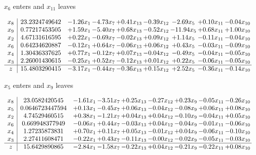 \documentclass[9pt]{article}
\begin{document}
 $ x_{6} $ enters and $ x_{11} $ leaves 

 \[\begin{array}{c| c c@{\hskip 2pt} c@{\hskip 2pt} c@{\hskip 2pt} c@{\hskip 2pt} c@{\hskip 2pt} c@{\hskip 2pt} c@{\hskip 2pt} }
 x_{8}   &  23.2324749642 & -1.26 x_{1} & -4.73 x_{7} & +  0.41 x_{13} & -0.39 x_{12} & -2.69 x_{5} & +  0.10 x_{11} & -0.04 x_{10}\\
 x_{9}   &  0.77217453505 & +  1.59 x_{1} & -5.40 x_{7} & +  0.68 x_{13} & -0.52 x_{12} & -11.94 x_{5} & +  0.68 x_{11} & +  1.00 x_{10}\\
 x_{2}   &  4.67131616595 & +  0.22 x_{1} & -0.69 x_{7} & -0.02 x_{13} & +  0.09 x_{12} & +  1.14 x_{5} & -0.11 x_{11} & -0.04 x_{10}\\
 x_{6}   &  0.64234620887 & -0.12 x_{1} & +  0.64 x_{7} & -0.06 x_{13} & +  0.06 x_{12} & +  0.43 x_{5} & -0.03 x_{11} & -0.09 x_{10}\\
 x_{4}   &  1.30436337625 & +  0.77 x_{1} & -0.12 x_{7} & +  0.07 x_{13} & -0.04 x_{12} & -0.49 x_{5} & -0.04 x_{11} & -0.05 x_{10}\\
 x_{3}   &  2.26001430615 & -0.25 x_{1} & +  0.52 x_{7} & -0.12 x_{13} & +  0.01 x_{12} & +  0.22 x_{5} & -0.06 x_{11} & -0.05 x_{10}\\
\hline
z    &  15.4803290415 & -3.17 x_{1} & -0.44 x_{7} & -0.36 x_{13} & +  0.15 x_{12} & +  2.52 x_{5} & -0.36 x_{11} & -0.14 x_{10}\\
\end{array}\]


 $ x_{5} $ enters and $ x_{9} $ leaves 

 \[\begin{array}{c| c c@{\hskip 2pt} c@{\hskip 2pt} c@{\hskip 2pt} c@{\hskip 2pt} c@{\hskip 2pt} c@{\hskip 2pt} c@{\hskip 2pt} }
 x_{8}   &  23.0582420545 & -1.61 x_{1} & -3.51 x_{7} & +  0.25 x_{13} & -0.27 x_{12} & +  0.23 x_{9} & -0.05 x_{11} & -0.26 x_{10}\\
 x_{5}   &  0.0646723447594 & +  0.13 x_{1} & -0.45 x_{7} & +  0.06 x_{13} & -0.04 x_{12} & -0.08 x_{9} & +  0.06 x_{11} & +  0.08 x_{10}\\
 x_{2}   &  4.74529460515 & +  0.38 x_{1} & -1.21 x_{7} & +  0.04 x_{13} & +  0.04 x_{12} & -0.10 x_{9} & -0.04 x_{11} & +  0.05 x_{10}\\
 x_{6}   &  0.669948377949 & -0.06 x_{1} & +  0.44 x_{7} & -0.03 x_{13} & +  0.04 x_{12} & -0.04 x_{9} & -0.01 x_{11} & -0.06 x_{10}\\
 x_{4}   &  1.27235873831 & +  0.70 x_{1} & +  0.11 x_{7} & +  0.05 x_{13} & -0.01 x_{12} & +  0.04 x_{9} & -0.06 x_{11} & -0.10 x_{10}\\
 x_{3}   &  2.27411608471 & -0.22 x_{1} & +  0.43 x_{7} & -0.11 x_{13} & -0.00 x_{12} & -0.02 x_{9} & -0.05 x_{11} & -0.03 x_{10}\\
\hline
z    &  15.6429890865 & -2.84 x_{1} & -1.58 x_{7} & -0.22 x_{13} & +  0.04 x_{12} & -0.21 x_{9} & -0.22 x_{11} & +  0.08 x_{10}\\
\end{array}\]
\end{document}
